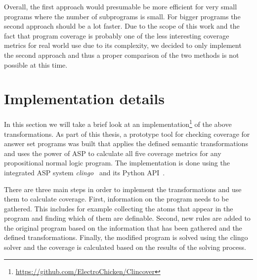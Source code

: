 Overall, the first approach would presumable be more efficient for very small programs where the number of subprograms is small. For bigger programs the second approach should be a lot faster. Due to the scope of this work and the fact that program coverage is probably one of the less interesting coverage metrics for real world use due to its complexity, we decided to only implement the second approach and thus a proper comparison of the two methods is not possible at this time.

\begin{comment}
- use the $\_ri$ labels from rule coverage, no new labels needed!   \/

- a subprogram $P' \subseteq P$ is covered if exactly all rules contained in $P'$ are covered and no other rules are covered        \/

- two ways to go about computing it!    \/

-> each answer set covers exactly one subprogram -> it is necessary to look at every answer set instead of just brave/cautious like with the other coverage metrics -> has to be computed seperately from the other coverage metrics!       \/

- for $P = \{r_1,...,r_n\}$,  $\{\_rx,...,\_ry\}$ are the rule labels in an answer set <=> $P'=\{r_x,...,r_y\}$ is covered      \/
\end{comment}

\section{Implementation details}
\label{sec:Computing coverage metrics for propositional programs/Implementation details}
In this section we will take a brief look at an implementation\footnote{\url{https://github.com/ElectroChicken/Clincover}} of the above transformations. As part of this thesis, a prototype tool for checking coverage for answer set programs was built that applies the defined semantic transformations and uses the power of ASP to calculate all five coverage metrics for any propositional normal logic program. The implementation is done using the integrated ASP system \emph{clingo}~\cite{Geb+19} and its Python API~\cite{Pot21}. 

There are three main steps in order to implement the transformations and use them to calculate coverage. First, information on the program needs to be gathered. This includes for example collecting the atoms that appear in the program and finding which of them are definable. Second, new rules are added to the original program based on the information that has been gathered and the defined transformations. Finally, the modified program is solved using the clingo solver and the coverage is calculated based on the results of the solving process.

